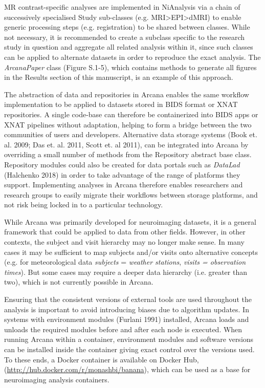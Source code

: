 MR contrast-specific analyses are implemented in NiAnalysis via a chain
of successively specialised Study sub-classes (e.g.
MRI\textgreater{}EPI\textgreater{}dMRI) to enable generic processing
steps (e.g. registration) to be shared between classes. While not
necessary, it is recommended to create a subclass specific to the
research study in question and aggregate all related analysis within it,
since such classes can be applied to alternate datasets in order to
reproduce the exact analysis. The \emph{ArcanaPaper} class (Figure
S.1-5), which contains methods to generate all figures in the Results
section of this manuscript, is an example of this approach.

The abstraction of data and repositories in Arcana enables the same
workflow implementation to be applied to datasets stored in BIDS format
or XNAT repositories. A single code-base can therefore be containerized
into BIDS apps or XNAT pipelines without adaptation, helping to form a
bridge between the two communities of users and developers. Alternative
data storage systems (Book et. al. 2009; Das et. al. 2011, Scott et. al
2011), can be integrated into Arcana by overriding a small number of
methods from the Repository abstract base class. Repository modules
could also be created for data portals such as \emph{DataLad} (Halchenko
2018) in order to take advantage of the range of platforms they support.
Implementing analyses in Arcana therefore enables researchers and
research groups to easily migrate their workflows between storage
platforms, and not risk being locked in to a particular technology.

While Arcana was primarily developed for neuroimaging datasets, it is a
general framework that could be applied to data from other fields.
However, in other contexts, the subject and visit hierarchy may no
longer make sense. In many cases it may be sufficient to map subjects
and/or visits onto alternative concepts (e.g. for meteorological data
\emph{subjects} = \emph{weather stations}, \emph{visits = observation
times}). But some cases may require a deeper data hierarchy (i.e.
greater than two), which is not currently possible in Arcana.

Ensuring that the consistent versions of external tools are used
throughout the analysis is important to avoid introducing biases due to
algorithm updates. In systems with environment modules (Furlani 1991)
installed, Arcana loads and unloads the required modules before and
after each node is executed. When running Arcana within a container,
environment modules and software versions can be installed inside the
container giving exact control over the versions used. To these ends, a
Docker container is available on Docker Hub,
(\href{http://hub.docker.com/r/monashbi/banana}{{http://hub.docker.com/r/monashbi/banana}}),
which can be used as a base for neuroimaging analysis containers.

